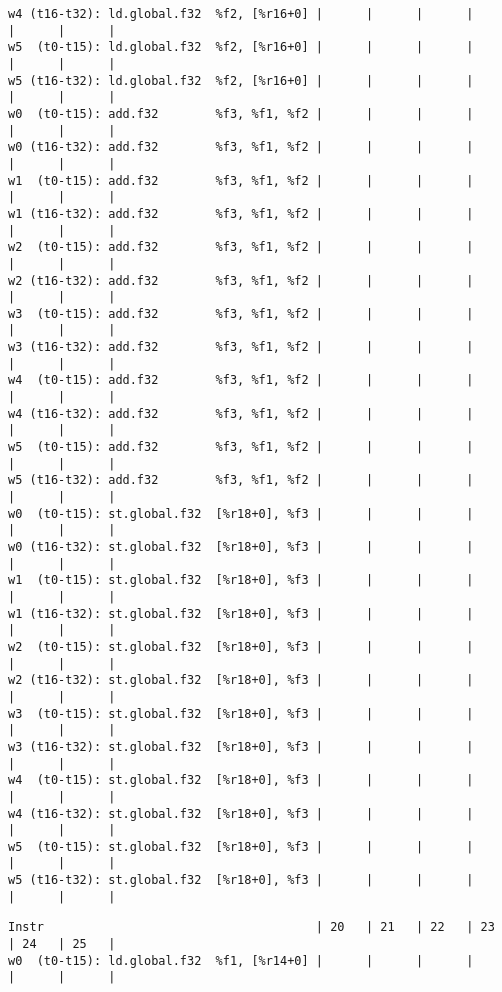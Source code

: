 \documentclass[11pt]{article}
\begin{document}
\begin{Answer}
\begin{verbatim}
w4 (t16-t32): ld.global.f32  %f2, [%r16+0] |      |      |      |      |      |      |
w5  (t0-t15): ld.global.f32  %f2, [%r16+0] |      |      |      |      |      |      |
w5 (t16-t32): ld.global.f32  %f2, [%r16+0] |      |      |      |      |      |      |
w0  (t0-t15): add.f32        %f3, %f1, %f2 |      |      |      |      |      |      |
w0 (t16-t32): add.f32        %f3, %f1, %f2 |      |      |      |      |      |      |
w1  (t0-t15): add.f32        %f3, %f1, %f2 |      |      |      |      |      |      |
w1 (t16-t32): add.f32        %f3, %f1, %f2 |      |      |      |      |      |      |
w2  (t0-t15): add.f32        %f3, %f1, %f2 |      |      |      |      |      |      |
w2 (t16-t32): add.f32        %f3, %f1, %f2 |      |      |      |      |      |      |
w3  (t0-t15): add.f32        %f3, %f1, %f2 |      |      |      |      |      |      |
w3 (t16-t32): add.f32        %f3, %f1, %f2 |      |      |      |      |      |      |
w4  (t0-t15): add.f32        %f3, %f1, %f2 |      |      |      |      |      |      |
w4 (t16-t32): add.f32        %f3, %f1, %f2 |      |      |      |      |      |      |
w5  (t0-t15): add.f32        %f3, %f1, %f2 |      |      |      |      |      |      |
w5 (t16-t32): add.f32        %f3, %f1, %f2 |      |      |      |      |      |      |
w0  (t0-t15): st.global.f32  [%r18+0], %f3 |      |      |      |      |      |      |
w0 (t16-t32): st.global.f32  [%r18+0], %f3 |      |      |      |      |      |      |
w1  (t0-t15): st.global.f32  [%r18+0], %f3 |      |      |      |      |      |      |
w1 (t16-t32): st.global.f32  [%r18+0], %f3 |      |      |      |      |      |      |
w2  (t0-t15): st.global.f32  [%r18+0], %f3 |      |      |      |      |      |      |
w2 (t16-t32): st.global.f32  [%r18+0], %f3 |      |      |      |      |      |      |
w3  (t0-t15): st.global.f32  [%r18+0], %f3 |      |      |      |      |      |      |
w3 (t16-t32): st.global.f32  [%r18+0], %f3 |      |      |      |      |      |      |
w4  (t0-t15): st.global.f32  [%r18+0], %f3 |      |      |      |      |      |      |
w4 (t16-t32): st.global.f32  [%r18+0], %f3 |      |      |      |      |      |      |
w5  (t0-t15): st.global.f32  [%r18+0], %f3 |      |      |      |      |      |      |
w5 (t16-t32): st.global.f32  [%r18+0], %f3 |      |      |      |      |      |      |
\end{verbatim}
\newpage
\begin{verbatim}
Instr                                      | 20   | 21   | 22   | 23   | 24   | 25   |
w0  (t0-t15): ld.global.f32  %f1, [%r14+0] |      |      |      |      |      |      |

\end{verbatim}
\end{Answer}
\end{document}
